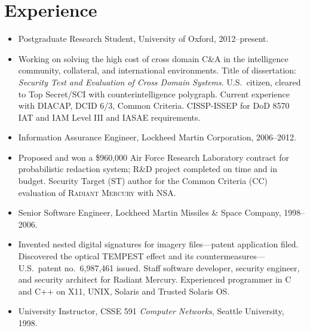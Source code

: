 \documentclass[12pt,twoside,letterpaper]{article}
\newenvironment{myquote}{\list{}{\leftmargin=0.25in\rightmargin=0in}\item[]}{\endlist}
\begin{document}
\section*{Experience}
\vspace{-2mm}
\begin{itemize}
	\item Postgraduate Research Student, University of Oxford, 2012--present.
		\vspace{-2mm}
		\begin{myquote}
			Working on solving the high cost of cross domain C\&A in the intelligence
			community, collateral, and international environments.  Title of dissertation:
			\emph{Security Test and Evaluation of Cross Domain Systems}.
			U.S.\ citizen, cleared to Top Secret/SCI with counterintelligence polygraph.
			Current experience with DIACAP, DCID 6/3, Common Criteria.
			CISSP-ISSEP for DoD 8570 IAT and IAM Level III and IASAE requirements.
		\end{myquote}

\vspace{-2.5mm}
	\item Information Assurance Engineer, Lockheed Martin Corporation, 2006--2012.
		\vspace{-2mm}
		\begin{myquote}
			Proposed and won a \$960,000 Air Force Research Laboratory contract
			for probabilistic redaction system; R\&D project completed on time
			and in budget.  Security Target (ST) author for the Common Criteria (CC)
			evaluation of \textsc{Radiant Mercury} with NSA.
		\end{myquote}

\vspace{-2.5mm}
	\item Senior Software Engineer, Lockheed Martin Missiles \& Space Company, 1998--2006.
		\vspace{-2mm}
		\begin{myquote}
			Invented nested digital signatures for imagery files---patent application filed.
			Discovered the optical TEMPEST effect and its
			countermeasures---U.S.\ patent no.\ 6,987,461 issued.  Staff software developer,
			security engineer, and security architect for
			Radiant Mercury.  Experienced programmer in C and C++ on X11, UNIX, Solaris and
			Trusted Solaris OS.
		\end{myquote}
\vspace{-2.5mm}
    \item University Instructor, CSSE 591 \emph{Computer Networks}, Seattle University, 1998.
\end{itemize}
\end{document}
